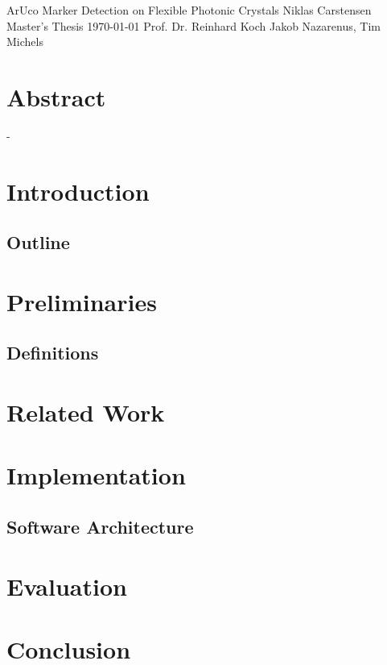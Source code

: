 \documentclass[10pt]{book}
\newcommand*\NewPage{\newpage\null\thispagestyle{empty}\newpage}
\begin{document}
\frontmatter

\studtitlepage%
{ArUco Marker Detection on Flexible Photonic Crystals}%
{}
{Niklas Carstensen}%
{Master's Thesis}%
{\today}%
{Prof. Dr. Reinhard Koch}%
{Jakob Nazarenus, Tim Michels}%
\NewPage{}
\setcounter{page}{2}
\studeidesstatt
\NewPage{}

\setcounter{page}{3}
\chapter*{Abstract}
-

\tableofcontents
\listoffigures
\mainmatter

\chapter{Introduction}

\section{Outline}

\chapter{Preliminaries}
\label{chap:prelim}

\section{Definitions}

\chapter{Related Work}
\label{chap:relatedw}

\chapter{Implementation}
\label{chap:implement}

\section{Software Architecture}

\chapter{Evaluation}
\label{chap:eval}

\chapter{Conclusion}
\label{chap:conclusion}
\end{document}
